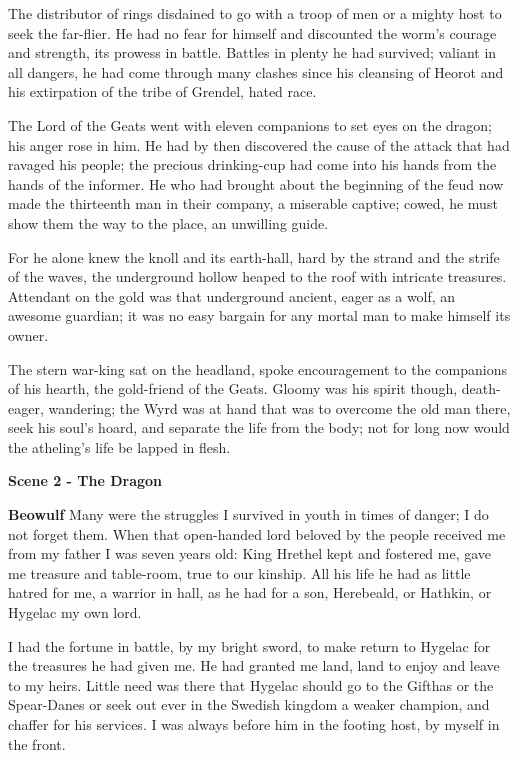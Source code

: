 \documentclass[a4paper]{article}
\begin{document}
{The distributor of rings disdained to go
with a troop of men or a mighty host
to seek the far-flier. He had no fear for himself
and discounted the worm’s courage and strength,
its prowess in battle. Battles in plenty
he had survived; valiant in all dangers,
he had come through many clashes since his cleansing of Heorot
and his extirpation of the tribe of Grendel, hated race.

The Lord of the Geats went with eleven companions
to set eyes on the dragon; his anger rose in him.
He had by then discovered the cause of the attack
that had ravaged his people; the precious drinking-cup
had come into his hands from the hands of the informer.
He who had brought about the beginning of the feud
now made the thirteenth man in their company,
a miserable captive; cowed, he must show them
the way to the place, an unwilling guide.

For he alone knew the knoll and its earth-hall,
hard by the strand and the strife of the waves,
the underground hollow heaped to the roof
with intricate treasures. Attendant on the gold
was that underground ancient, eager as a wolf,
an awesome guardian; it was no easy bargain
for any mortal man to make himself its owner.

The stern war-king sat on the headland,
spoke encouragement to the companions of his hearth,
the gold-friend of the Geats. Gloomy was his spirit though,
death-eager, wandering; the Wyrd was at hand
that was to overcome the old man there,
seek his soul’s hoard, and separate
the life from the body; not for long now
would the atheling’s life be lapped in flesh.

\centerline{\textbf{Scene 2 - The Dragon}}

\textbf{Beowulf} Many were the struggles I survived in youth
in times of danger; I do not forget them.
When that open-handed lord beloved by the people
received me from my father I was seven years old:
King Hrethel kept and fostered me,
gave me treasure and table-room, true to our kinship.
All his life he had as little hatred for me,
 a warrior in hall, as he had for a son,
Herebeald, or Hathkin, or Hygelac my own lord.

 I had the fortune in battle, by my bright sword,
to make return to Hygelac for the treasures he had given me.
He had granted me land, land to enjoy
and leave to my heirs. Little need was there
that Hygelac should go to the Gifthas or the Spear-Danes
or seek out ever in the Swedish kingdom
a weaker champion, and chaffer for his services.
I was always before him in the footing host,
by myself in the front.

}
\end{document}
